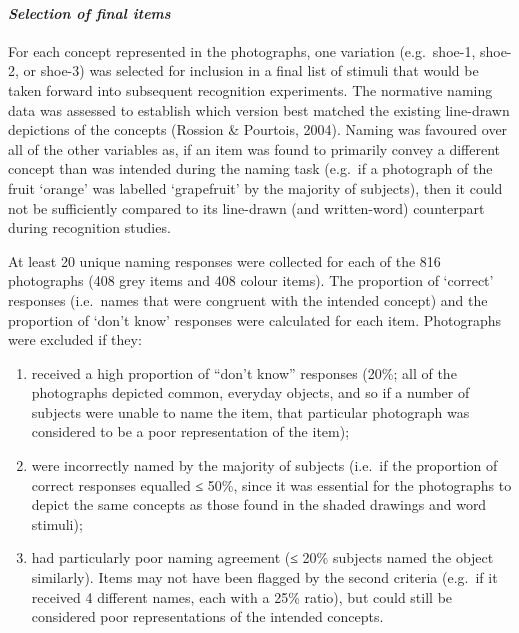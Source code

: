 \documentclass[
  11pt,
]{article}
\providecommand{\tightlist}{%
  \setlength{\itemsep}{0pt}\setlength{\parskip}{0pt}}
\begin{document}
\hypertarget{selection-of-final-items}{%
\paragraph{\texorpdfstring{\emph{Selection of final
items}}{Selection of final items}}\label{selection-of-final-items}}

For each concept represented in the photographs, one variation
(e.g.~shoe-1, shoe-2, or shoe-3) was selected for inclusion in a final
list of stimuli that would be taken forward into subsequent recognition
experiments. The normative naming data was assessed to establish which
version best matched the existing line-drawn depictions of the concepts
(Rossion \& Pourtois, 2004). Naming was favoured over all of the other
variables as, if an item was found to primarily convey a different
concept than was intended during the naming task (e.g.~if a photograph
of the fruit `orange' was labelled `grapefruit' by the majority of
subjects), then it could not be sufficiently compared to its line-drawn
(and written-word) counterpart during recognition studies.

At least 20 unique naming responses were collected for each of the 816
photographs (408 grey items and 408 colour items). The proportion of
`correct' responses (i.e.~names that were congruent with the intended
concept) and the proportion of `don't know' responses were calculated
for each item. Photographs were excluded if they:

\begin{enumerate}
\def\labelenumi{\arabic{enumi}.}
\tightlist
\item
  received a high proportion of ``don't know'' responses (20\%; all of
  the photographs depicted common, everyday objects, and so if a number
  of subjects were unable to name the item, that particular photograph
  was considered to be a poor representation of the item);
\item
  were incorrectly named by the majority of subjects (i.e.~if the
  proportion of correct responses equalled ≤ 50\%, since it was
  essential for the photographs to depict the same concepts as those
  found in the shaded drawings and word stimuli);
\item
  had particularly poor naming agreement (≤ 20\% subjects named the
  object similarly). Items may not have been flagged by the second
  criteria (e.g.~if it received 4 different names, each with a 25\%
  ratio), but could still be considered poor representations of the
  intended concepts.
\end{enumerate}
\end{document}
